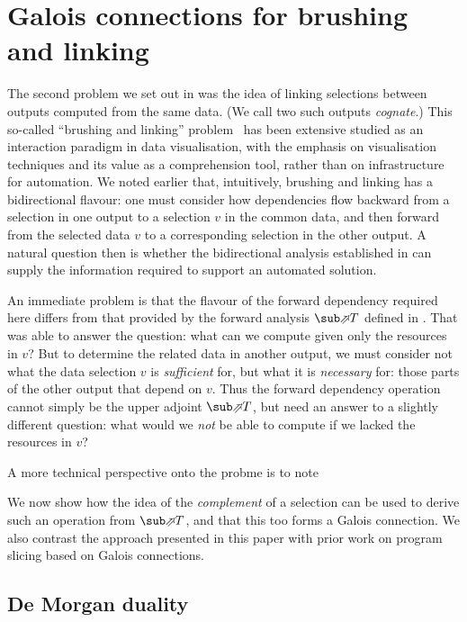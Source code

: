 \section{Galois connections for brushing and linking}
\label{sec:toolkit}

The second problem we set out in  was the idea of linking selections between outputs computed from the same data. (We call two such outputs \emph{cognate}.) This so-called ``brushing and linking'' problem~\cite{becker87} has been extensive studied as an interaction paradigm in data visualisation, with the emphasis on visualisation techniques and its value as a comprehension tool, rather than on infrastructure for automation. We noted earlier that, intuitively, brushing and linking has a bidirectional flavour: one must consider how dependencies flow backward from a selection in one output to a selection $v$ in the common data, and then forward from the selected data $v$ to a corresponding selection in the other output. A natural question then is whether the bidirectional analysis established in  can supply the information required to support an automated solution.

An immediate problem is that the flavour of the forward dependency required here differs from that provided by the forward analysis $\evalFwdF{T}$ defined in . That was able to answer the question: what can we compute given only the resources in $v$? But to determine the related data in another output, we must consider not what the data selection $v$ is \emph{sufficient} for, but what it is \emph{necessary} for: those parts of the other output that depend on $v$. Thus the forward dependency operation cannot simply be the upper adjoint $\evalFwdF{T}$, but need an answer to a slightly different question: what would we \emph{not} be able to compute if we lacked the resources in $v$?

A more technical perspective onto the probme is to note



We now show how the idea of the \emph{complement} of a selection can be used to derive such an operation from $\evalFwdF{T}$, and that this too forms a Galois connection. We also contrast the approach presented in this paper with prior work on program slicing based on Galois connections.

\subsection{De Morgan duality}

